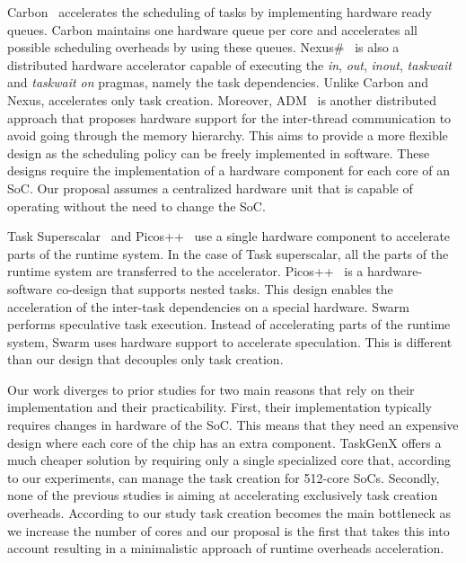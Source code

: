 Carbon~\cite{Carbon} accelerates the scheduling of tasks by implementing hardware ready queues.
Carbon maintains one hardware queue per core and accelerates all possible scheduling overheads by using these queues.
Nexus\#~\cite{Nexus} is also a distributed hardware accelerator capable of executing the \textit{in}, \textit{out}, \textit{inout}, \textit{taskwait} and \textit{taskwait on} pragmas, namely the task dependencies.
Unlike Carbon and Nexus, {\proposal} accelerates only task creation.
Moreover, ADM~\cite{Sanchez:2010} is another distributed approach that proposes hardware support for the inter-thread communication to avoid going through the memory hierarchy. 
This aims to provide a more flexible design as the scheduling policy can be freely implemented in software.
These designs require the implementation of a hardware component for each core of an SoC.
Our proposal assumes a centralized hardware unit that is capable of operating without the need to change the SoC.

Task Superscalar~\cite{TaskSS} and Picos++~\cite{Xubin} use a single hardware component to accelerate parts of the runtime system.
In the case of Task superscalar, all the parts of the runtime system are transferred to the accelerator.
Picos++~\cite{Xubin} is a hardware-software co-design that supports nested tasks. 
This design enables the acceleration of the inter-task dependencies on a special hardware.
Swarm~\cite{Swarm} performs speculative task execution. 
Instead of accelerating parts of the runtime system, Swarm uses hardware support to accelerate speculation.
This is different than our design that decouples only task creation.

Our work diverges to prior studies for two main reasons that rely on their implementation and their practicability. 
First, their implementation typically requires changes in hardware of the SoC.
	This means that they need an expensive design where each core of the chip has an extra component.
	TaskGenX offers a much cheaper solution by requiring only a single specialized core that, according to our experiments, can manage the task creation for 512-core SoCs.
Secondly, none of the previous studies is aiming at accelerating exclusively task creation overheads. 
	According to our study task creation becomes the main bottleneck as we increase the number of cores and our proposal is the first that takes this into account resulting in a minimalistic approach of runtime overheads acceleration.




